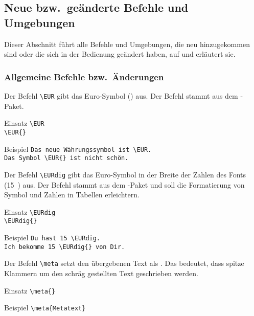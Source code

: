 \subsection{Neue bzw.\ geänderte Befehle und Umgebungen}
\label{sec:New}

Dieser Abschnitt führt alle Befehle und Umgebungen, die neu hinzugekommen sind oder die sich in der Bedienung geändert haben, auf und erläutert sie.

\subsubsection{Allgemeine Befehle bzw.\ Änderungen}
\label{sec:New:Allgemein}

\DescribeMacro{\EUR}
Der Befehl \verb#\EUR# gibt das Euro-Symbol (\EUR) aus.
Der Befehl stammt aus dem -Paket.
\begin{einspiel}{Einsatz}
 \>\verb#\EUR#\\
 \>\verb#\EUR{}#
\end{einspiel}
\begin{einspiel}{Beispiel}
 \>\verb#Das neue Währungssymbol ist \EUR.#\\
 \>\verb#Das Symbol \EUR{} ist nicht schön.#
\end{einspiel}

\DescribeMacro{\EURdig}
Der Befehl \verb#\EURdig# gibt das Euro-Symbol in der Breite der Zahlen des
Fonts (15~\EURdig) aus.
Der Befehl stammt aus dem -Paket und
soll die Formatierung von Symbol und Zahlen in Tabellen erleichtern.
\begin{einspiel}{Einsatz}
 \>\verb#\EURdig#\\
 \>\verb#\EURdig{}#
\end{einspiel}
\begin{einspiel}{Beispiel}
 \>\verb#Du hast 15 \EURdig.#\\
 \>\verb#Ich bekomme 15 \EURdig{} von Dir.#
\end{einspiel}

\DescribeMacro{\meta}
Der Befehl \verb#\meta# setzt den übergebenen Text als .
Das
bedeutet, dass spitze Klammern um den schräg gestellten Text geschrieben werden.
\begin{einspiel}{Einsatz}
 \>\verb#\meta{#\verb#}#
\end{einspiel}
\begin{einspiel}{Beispiel}
 \>\verb#\meta{Metatext}#
\end{einspiel}

